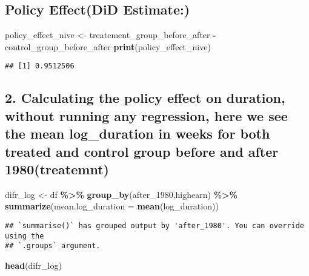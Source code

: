 \documentclass[
]{article}
\newenvironment{Shaded}{\begin{snugshade}}{\end{snugshade}}
\newcommand{\AttributeTok}[1]{\textcolor[rgb]{0.13,0.29,0.53}{#1}}
\newcommand{\FunctionTok}[1]{\textcolor[rgb]{0.13,0.29,0.53}{\textbf{#1}}}
\newcommand{\NormalTok}[1]{#1}
\newcommand{\OtherTok}[1]{\textcolor[rgb]{0.56,0.35,0.01}{#1}}
\newcommand{\SpecialCharTok}[1]{\textcolor[rgb]{0.81,0.36,0.00}{\textbf{#1}}}
\begin{document}
\subsection{Policy Effect(DiD
Estimate:)}\label{policy-effectdid-estimate}

\begin{Shaded}
\begin{Highlighting}[]
\NormalTok{policy\_effect\_nive }\OtherTok{\textless{}{-}}\NormalTok{ treatement\_group\_before\_after }\SpecialCharTok{{-}}\NormalTok{ control\_group\_before\_after}
\FunctionTok{print}\NormalTok{(policy\_effect\_nive)}
\end{Highlighting}
\end{Shaded}

\begin{verbatim}
## [1] 0.9512506
\end{verbatim}

\subsection{2. Calculating the policy effect on duration, without
running any regression, here we see the mean log\_duration in weeks for
both treated and control group before and after
1980(treatemnt)}\label{calculating-the-policy-effect-on-duration-without-running-any-regression-here-we-see-the-mean-log_duration-in-weeks-for-both-treated-and-control-group-before-and-after-1980treatemnt}

\begin{Shaded}
\begin{Highlighting}[]
\NormalTok{difr\_log }\OtherTok{\textless{}{-}}\NormalTok{ df }\SpecialCharTok{\%\textgreater{}\%} \FunctionTok{group\_by}\NormalTok{(after\_1980,highearn) }\SpecialCharTok{\%\textgreater{}\%} \FunctionTok{summarize}\NormalTok{(}\AttributeTok{mean.log\_duration =} \FunctionTok{mean}\NormalTok{(log\_duration))}
\end{Highlighting}
\end{Shaded}

\begin{verbatim}
## `summarise()` has grouped output by 'after_1980'. You can override using the
## `.groups` argument.
\end{verbatim}

\begin{Shaded}
\begin{Highlighting}[]
\FunctionTok{head}\NormalTok{(difr\_log)}
\end{Highlighting}
\end{Shaded}
\end{document}
